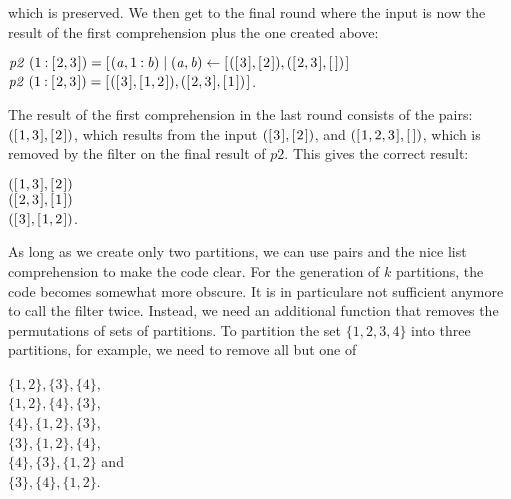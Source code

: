\documentclass{scrreprt}
\newcommand{\Varid}[1]{\mathit{#1}}
\begin{document}
which is preserved.
We then get to the final round
where the input is now the result of the first comprehension
plus the one created above:

\ensuremath{\Varid{p2}\;(\mathrm{1}\mathbin{:}[\mskip1.5mu \mathrm{2},\mathrm{3}\mskip1.5mu])\mathrel{=}[\mskip1.5mu (\Varid{a},\mathrm{1}\mathbin{:}\Varid{b})\mid (\Varid{a},\Varid{b})\leftarrow [\mskip1.5mu ([\mskip1.5mu \mathrm{3}\mskip1.5mu],[\mskip1.5mu \mathrm{2}\mskip1.5mu]),([\mskip1.5mu \mathrm{2},\mathrm{3}\mskip1.5mu],[\mskip1.5mu \mskip1.5mu])\mskip1.5mu]}\\
\ensuremath{\Varid{p2}\;(\mathrm{1}\mathbin{:}[\mskip1.5mu \mathrm{2},\mathrm{3}\mskip1.5mu])\mathrel{=}[\mskip1.5mu ([\mskip1.5mu \mathrm{3}\mskip1.5mu],[\mskip1.5mu \mathrm{1},\mathrm{2}\mskip1.5mu]),([\mskip1.5mu \mathrm{2},\mathrm{3}\mskip1.5mu],[\mskip1.5mu \mathrm{1}\mskip1.5mu])\mskip1.5mu]}.

The result of the first comprehension in the last round consists of the pairs:
\ensuremath{([\mskip1.5mu \mathrm{1},\mathrm{3}\mskip1.5mu],[\mskip1.5mu \mathrm{2}\mskip1.5mu])}, which results from the input \ensuremath{([\mskip1.5mu \mathrm{3}\mskip1.5mu],[\mskip1.5mu \mathrm{2}\mskip1.5mu])}, and
\ensuremath{([\mskip1.5mu \mathrm{1},\mathrm{2},\mathrm{3}\mskip1.5mu],[\mskip1.5mu \mskip1.5mu])}, which is removed by the filter on the final result of \ensuremath{\Varid{p2}}.
This gives the correct result: 

\ensuremath{([\mskip1.5mu \mathrm{1},\mathrm{3}\mskip1.5mu],[\mskip1.5mu \mathrm{2}\mskip1.5mu])}\\
\ensuremath{([\mskip1.5mu \mathrm{2},\mathrm{3}\mskip1.5mu],[\mskip1.5mu \mathrm{1}\mskip1.5mu])}\\
\ensuremath{([\mskip1.5mu \mathrm{3}\mskip1.5mu],[\mskip1.5mu \mathrm{1},\mathrm{2}\mskip1.5mu])}.

As long as we create only two partitions,
we can use pairs and the 
nice list comprehension to make the code clear.
For the generation of $k$ partitions,
the code becomes somewhat more obscure.
It is in particulare not sufficient anymore
to call the filter twice.
Instead, we need an additional function
that removes the permutations of sets of partitions.
To partition the set $\lbrace 1,2,3,4\rbrace$
into three partitions, for example,
we need to remove all but one of

$\lbrace 1,2\rbrace, \lbrace 3\rbrace, \lbrace 4\rbrace$,\\ 
$\lbrace 1,2\rbrace, \lbrace 4\rbrace, \lbrace 3\rbrace$,\\
$\lbrace 4\rbrace, \lbrace 1,2\rbrace, \lbrace 3\rbrace$,\\
$\lbrace 3\rbrace, \lbrace 1,2\rbrace, \lbrace 4\rbrace$,\\
$\lbrace 4\rbrace, \lbrace 3\rbrace, \lbrace 1,2\rbrace$ and\\
$\lbrace 3\rbrace, \lbrace 4\rbrace, \lbrace 1,2\rbrace$.
\end{document}

